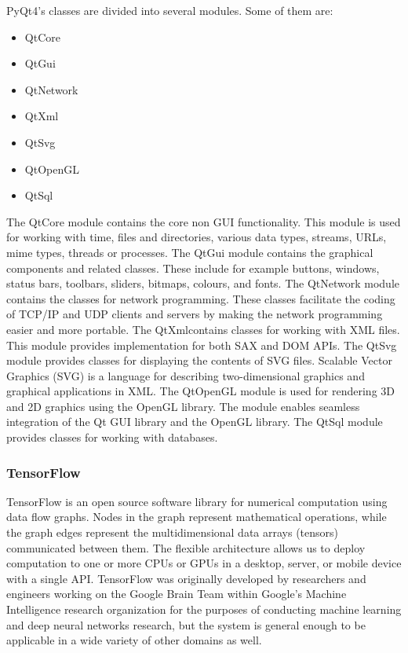 PyQt4's classes are divided into several modules. Some of them are:
\begin{itemize}
	\item QtCore
	\item QtGui
	\item QtNetwork
	\item QtXml
	\item QtSvg
	\item QtOpenGL
	\item QtSql
\end{itemize}
The QtCore module contains the core non GUI functionality. This module is used for working with time, files and directories, various data types, streams, URLs, mime types, threads or processes. The QtGui module contains the graphical components and related classes. These include for example buttons, windows, status bars, toolbars, sliders, bitmaps, colours, and fonts. The QtNetwork module contains the classes for network programming. These classes facilitate the coding of TCP/IP and UDP clients and servers by making the network programming easier and more portable. The QtXmlcontains classes for working with XML files. This module provides implementation for both SAX and DOM APIs. The QtSvg module provides classes for displaying the contents of SVG files. Scalable Vector Graphics (SVG) is a language for describing two-dimensional graphics and graphical applications in XML. The QtOpenGL module is used for rendering 3D and 2D graphics using the OpenGL library. The module enables seamless integration of the Qt GUI library and the OpenGL library. The QtSql module provides classes for working with databases.

\subsubsection{TensorFlow}

TensorFlow is an open source software library for numerical computation using data flow graphs. Nodes in the graph represent mathematical operations, while the graph edges represent the multidimensional data arrays (tensors) communicated between them. The flexible architecture allows us to deploy computation to one or more CPUs or GPUs in a desktop, server, or mobile device with a single API. TensorFlow was originally developed by researchers and engineers working on the Google Brain Team within Google's Machine Intelligence research organization for the purposes of conducting machine learning and deep neural networks research, but the system is general enough to be applicable in a wide variety of other domains as well. 

